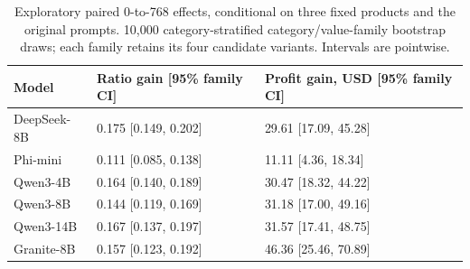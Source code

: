 \begin{table}[htbp]
\caption{Exploratory paired 0-to-768 effects, conditional on three fixed products and the original prompts. 10,000 category-stratified category/value-family bootstrap draws; each family retains its four candidate variants. Intervals are pointwise.}
\label{tab:familyendpoints}
\centering
\small
\begin{tabularx}{\linewidth}{lXX}
\toprule
Model & Ratio gain [95\% family CI] & Profit gain, USD [95\% family CI] \\
\midrule
DeepSeek-8B & 0.175 [0.149, 0.202] & 29.61 [17.09, 45.28] \\
Phi-mini & 0.111 [0.085, 0.138] & 11.11 [4.36, 18.34] \\
Qwen3-4B & 0.164 [0.140, 0.189] & 30.47 [18.32, 44.22] \\
Qwen3-8B & 0.144 [0.119, 0.169] & 31.18 [17.00, 49.16] \\
Qwen3-14B & 0.167 [0.137, 0.197] & 31.57 [17.41, 48.75] \\
Granite-8B & 0.157 [0.123, 0.192] & 46.36 [25.46, 70.89] \\
\bottomrule
\end{tabularx}
\end{table}

